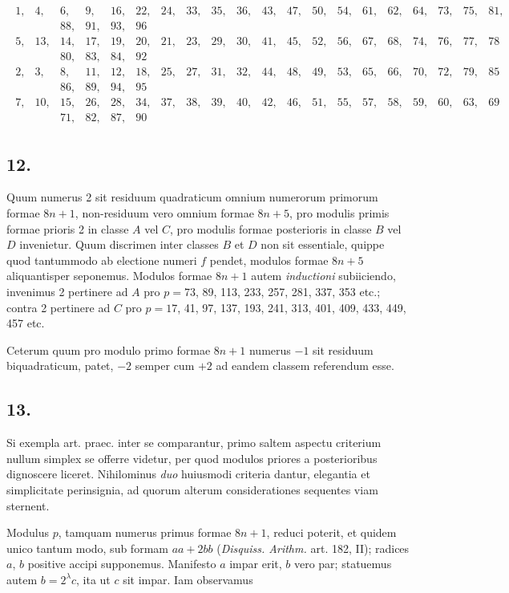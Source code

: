 \documentclass[twoside,12pt, showframe]{memoir}
\begin{document}
\[\begin{aligned}
\begin{array}{|rrrrrrrrrrrrrrrrrrrrrr}
1,&4,&6,&9,&16,&22,&24,&33,&35,&36,&43,&47,&50,&54,&61,&62,&64,&73,&75,&81,\\
&&88,&91,&93,&96 \\ 
5,&13,&14,& 17,&19,&20,&21,&23,&29,&30,&41,&45,&52,&56,&67,&68,&74,&76,&77,&78 \\ 
&&80,&83,&84,&92 \\
2,& 3,& 8,&11,&12,&18,&25,&27,&31,&32,&44,&48,&49,&53,&65,&66,&70,&72,&79,&85 \\ 
&&86,&89,&94,&95\\
7,&10,&15,&26,&28,&34,& 37,&38,&39,&40,&42,&46,&51,&55,&57,&58,&59,&60,&63,&69 \\
&&71,&82,&87,&90
\end{array} 
\end{aligned}\]

\subsection*{12.}
 
Quum numerus 2 sit residuum quadraticum omnium numerorum primorum formae \(8 n+1\), non-residuum vero omnium formae \(8 n+5\), pro modulis primis formae prioris 2 in classe \(A\) vel \(C\), pro modulis formae posterioris in classe \(B\) vel \(D\) invenietur. Quum discrimen inter classes \(B\) et \(D\) non sit essentiale, quippe quod tantummodo ab electione numeri \(f\) pendet, modulos formae \(8 n+5\) aliquantisper seponemus. Modulos formae \(8 n+1\) autem \textit{inductioni} subiiciendo, invenimus 2 pertinere ad \(A\) pro \(p=73\), 89, 113, 233, 257, 281, 337, 353 etc.; contra 2 pertinere ad \(C\) pro \(p=17\), 41, 97, 137, 193, 241, 313, 401, 409, 433, 449, 457 etc.
 
Ceterum quum pro modulo primo formae \(8 n+1\) numerus \(-1\) sit residuum biquadraticum, patet, \(-2\) semper cum \(+2\) ad eandem classem referendum esse.\clearpage\noindent%

\subsection*{13.}
 
Si exempla art. praec. inter se comparantur, primo saltem aspectu criterium nullum simplex se offerre videtur, per quod modulos priores a posterioribus dignoscere liceret. Nihilominus \textit{duo} huiusmodi criteria dantur, elegantia et simplicitate perinsignia, ad quorum alterum considerationes sequentes viam sternent.

Modulus \(p\), tamquam numerus primus formae \(8 n+1\), reduci poterit, et quidem unico tantum modo, sub formam \(a a+2 b b\) (\textit{Disquiss. Arithm.} art. 182, II); radices \(a\), \(b\) positive accipi supponemus. Manifesto \(a\) impar erit, \(b\) vero par; statuemus autem \(b=2^{\lambda} c\), ita ut \(c\) sit impar. Iam observamus
 
\end{document}
